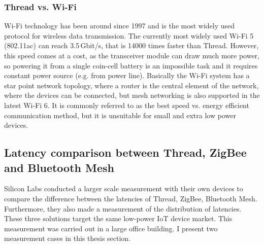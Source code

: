 \subsubsection{Thread vs. Wi-Fi}
Wi-Fi technology has been around since 1997 and is the most widely used protocol for wireless data transmission. The currently most widely used Wi-Fi 5 (802.11ac) can reach 3.5\,\si{\giga bit/s}, that is 14000 times faster than Thread. However, this speed comes at a cost, as the transceiver module can draw much more power, so powering it from a single coin-cell battery is an impossible task and it requires constant power source (e.g. from power line). Basically the Wi-Fi system has a star point network topology, where a router is the central element of the network, where the devices can be connected, but mesh networking is also supported in the latest Wi-Fi 6. It is commonly referred to as the best speed vs. energy efficient communication method, but it is unsuitable for small and extra low power devices. 


\subsection{Latency comparison between Thread, ZigBee and Bluetooth Mesh}
Silicon Labs conducted a larger scale measurement with their own devices to compare the difference between the latencies of Thread, ZigBee, Bluetooth Mesh. Furthermore, they also made a measurement of the distribution of latencies. These three solutions target the same low-power IoT device market. This measurement was carried out in a large office building. I present two measurement cases in this thesis section.

